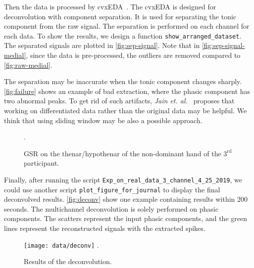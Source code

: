 \documentclass[]{article}
\begin{document}
Then the data is processed by cvxEDA~\cite{greco2015cvxeda}. The cvxEDA is designed for deconvolution with component separation. It is used for separating the tonic component from the raw signal. The separation is performed on each channel for each data. To show the results, we design a function \texttt{show\_arranged\_dataset}. The separated signals are plotted in \autoref{fig:sep-signal}. Note that in \autoref{fig:sep-signal-medial}, since the data is pre-processed, the outliers are removed compared to \autoref{fig:raw-medial}.

The separation may be inaccurate when the tonic component changes sharply. \autoref{fig:failure} shows an example of bad extraction, where the phasic component has two abnormal peaks. To get rid of such artifacts, \textit{Jain et. al.}~\cite{jain2016compressed} proposes that working on differentiated data rather than the original data may be helpful. We think that using sliding window may be also a possible approach.

\begin{figure}[htbp]
  \centering
  \DeclareGraphicsExtensions.
  \caption{GSR on the thenar/hypothenar of the non-dominant hand of the $3^{\mathrm{rd}}$ participant.} \label{fig:failure}
\end{figure}

Finally, after running the script \texttt{Exp\_on\_real\_data\_3\_channel\_4\_25\_2019}, we could use another script \texttt{plot\_figure\_for\_journal} to display the final deconvolved results. \autoref{fig:deconv} show one example containing results within 200 seconds. The multichannel deconvolution is solely performed on phasic components. The scatters represent the input phasic components, and the green lines represent the reconstructed signals with the extracted spikes.

\begin{figure}[htbp]
  \centering
  \texttt{[image: data/deconv]}
  \DeclareGraphicsExtensions.
  \caption{Results of the deconvolution.} \label{fig:deconv}
\end{figure}



\end{document}
